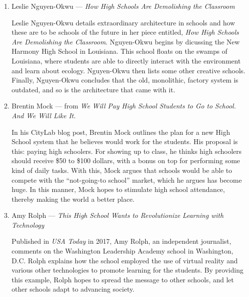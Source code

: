 \documentclass[12pt]{article}
\begin{document}
\begin{enumerate}
      \item Leslie Nguyen-Okwu — \textit{How High Schools Are Demolishing the Classroom}

        \begin{justify}
          Leslie Nguyen-Okwu details extraordinary architecture in schools and how these are to be schools of the future in her piece entitled, \textit{How High Schools Are Demolishing the Classroom}. Nguyen-Okwu begins by dicussing the New Harmony High School in Louisiana. This school floats on the swamps of Louisiana, where students are able to directly interact with the environment and learn about ecology. Nguyen-Okwu then lists some other creative schools. Finally, Nguyen-Okwu concludes that the old, monolithic, factory system is outdated, and so is the architecture that came with it.
        \end{justify}

      \item Brentin Mock — from \textit{We Will Pay High School Students to Go to School. And We Will Like It.}

        \begin{justify}
          In his CityLab blog post, Brentin Mock outlines the plan for a new High School system that he believes would work for the students. His proposal is this: paying high schoolers. For showing up to class, he thinks high schoolers should receive \$50 to \$100 dollars, with a bonus on top for performing some kind of daily tasks. With this, Mock argues that schools would be able to compete with the “not-going-to school” market, which he argues has become huge. In this manner, Mock hopes to stimulate high school attendance, thereby making the world a better place.
        \end{justify}

      \item Amy Rolph — \textit{This High School Wants to Revolutionize Learning with Technology}

        \begin{justify}
          Published in \textit{USA Today} in 2017, Amy Rolph, an independent journalist, comments on the Washington Leadership Academy school in Washington, D.C. Rolph explains how the school employed the use of virtual reality and various other technologies to promote learning for the students. By providing this example, Rolph hopes to spread the message to other schools, and let other schools adapt to advancing society.
        \end{justify}

    \end{enumerate}
\end{document}
